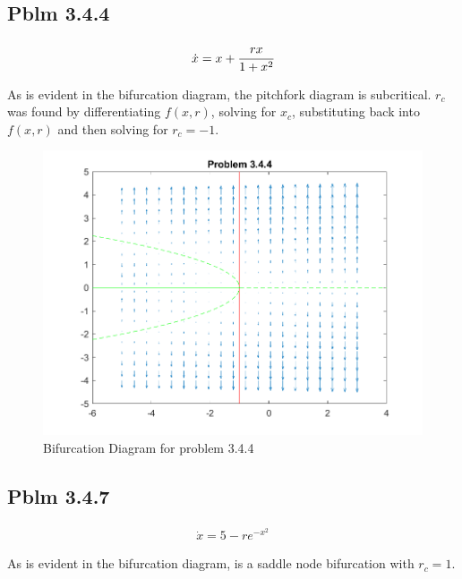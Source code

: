 \documentclass[letter]{article}
\begin{document}
\newpage
\subsection{Pblm 3.4.4}

\begin{align*}
	\dot{x} = x + \cfrac{r x}{1+x^2}
\end{align*}

As is evident in the bifurcation diagram, the pitchfork diagram is subcritical. $r_c$ was found by differentiating $f(x,r)$, solving for $x_c$, substituting back into $f(x,r)$ and then solving for $r_c = -1$.


\begin{figure}[h]
	\centering
	\includegraphics[width=\linewidth]{fig/pblm4_344}
	\caption{Bifurcation Diagram for problem 3.4.4}
	\label{fig:pblm4344}
\end{figure}

\newpage
\subsection{Pblm 3.4.7}

\begin{align*}
	\dot{x} = 5 - r e^{-x^2}
\end{align*}

As is evident in the bifurcation diagram, is a saddle node bifurcation with $r_c = 1$.
\end{document}
